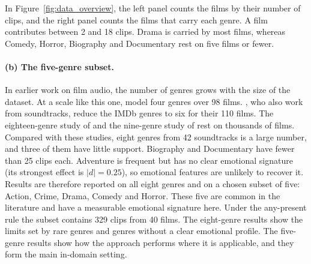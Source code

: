 In Figure~\ref{fig:data_overview}, the left panel counts the films by their number of clips, and the right panel counts the films that carry each genre. A film contributes between 2 and 18 clips. Drama is carried by most films, whereas Comedy, Horror, Biography and Documentary rest on five films or fewer.

\paragraph{(b) The five-genre subset.} In earlier work on film audio, the number of genres grows with the size of the dataset. At a scale like this one, \citet{austin2010characterization} model four genres over 98 films. \citet{ma2021computational}, who also work from soundtracks, reduce the IMDb genres to six for their 110 films. The eighteen-genre study of \citet{mangolin2020multimodal} and the nine-genre study of \citet{behrouzi2023multimodal} rest on thousands of films. Compared with these studies, eight genres from 42 soundtracks is a large number, and three of them have little support. Biography and Documentary have fewer than 25 clips each. Adventure is frequent but has no clear emotional signature (its strongest effect is $|d| = 0.25$), so emotional features are unlikely to recover it. Results are therefore reported on all eight genres and on a chosen subset of five: Action, Crime, Drama, Comedy and Horror. These five are common in the literature and have a measurable emotional signature here. Under the any-present rule the subset contains 329 clips from 40 films. The eight-genre results show the limits set by rare genres and genres without a clear emotional profile. The five-genre results show how the approach performs where it is applicable, and they form the main in-domain setting.

